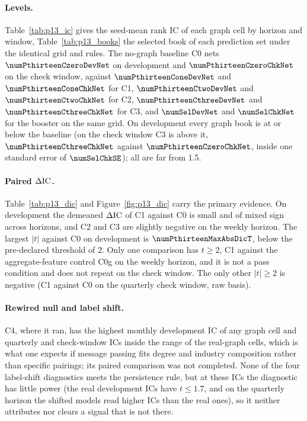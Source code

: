 \paragraph{Levels.}
Table~\ref{tab:p13_ic} gives the seed-mean rank IC of each graph cell by horizon and window, Table~\ref{tab:p13_books} the selected book of each prediction set under the identical grid and rules. The no-graph baseline C0 nets $\numPthirteenCzeroDevNet$ on development and $\numPthirteenCzeroChkNet$ on the check window, against $\numPthirteenConeDevNet$ and $\numPthirteenConeChkNet$ for C1, $\numPthirteenCtwoDevNet$ and $\numPthirteenCtwoChkNet$ for C2, $\numPthirteenCthreeDevNet$ and $\numPthirteenCthreeChkNet$ for C3, and $\numSelDevNet$ and $\numSelChkNet$ for the booster on the same grid. On development every graph book is at or below the baseline (on the check window C3 is above it, $\numPthirteenCthreeChkNet$ against $\numPthirteenCzeroChkNet$, inside one standard error of $\numSelChkSE$); all are far from 1.5.

\paragraph{Paired $\Delta\mathrm{IC}$.}
Table~\ref{tab:p13_dic} and Figure~\ref{fig:p13_dic} carry the primary evidence. On development the demeaned $\Delta\mathrm{IC}$ of C1 against C0 is small and of mixed sign across horizons, and C2 and C3 are slightly negative on the weekly horizon. The largest $|t|$ against C0 on development is $\numPthirteenMaxAbsDicT$, below the pre-declared threshold of 2. Only one comparison has $t\ge2$, C1 against the aggregate-feature control C0g on the weekly horizon, and it is not a pass condition and does not repeat on the check window. The only other $|t|\ge2$ is negative (C1 against C0 on the quarterly check window, raw basis).

\paragraph{Rewired null and label shift.}
C4, where it ran, has the highest monthly development IC of any graph cell and quarterly and check-window ICs inside the range of the real-graph cells, which is what one expects if message passing fits degree and industry composition rather than specific pairings; its paired comparison was not completed. None of the four label-shift diagnostics meets the persistence rule, but at these ICs the diagnostic has little power (the real development ICs have $t\le1.7$, and on the quarterly horizon the shifted models read higher ICs than the real ones), so it neither attributes nor clears a signal that is not there.

